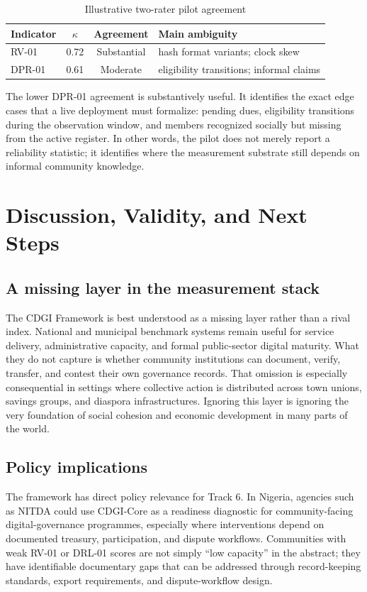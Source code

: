 \documentclass[sigconf,anonymous]{acmart}
\begin{document}
\begin{table}[t]
\caption{Illustrative two-rater pilot agreement}
\label{tab:kappa}
\small
\begin{tabularx}{\columnwidth}{l c c X}
\toprule
Indicator & $\kappa$ & Agreement & Main ambiguity \\
\midrule
RV-01 & 0.72 & Substantial & hash format variants; clock skew \\
DPR-01 & 0.61 & Moderate & eligibility transitions; informal claims \\
\bottomrule
\end{tabularx}
\end{table}

The lower DPR-01 agreement is substantively useful. It identifies the exact edge cases that a live deployment must formalize: pending dues, eligibility transitions during the observation window, and members recognized socially but missing from the active register. In other words, the pilot does not merely report a reliability statistic; it identifies where the measurement substrate still depends on informal community knowledge.

\section{Discussion, Validity, and Next Steps}

\subsection{A missing layer in the measurement stack}

The CDGI Framework is best understood as a missing layer rather than a rival index. National and municipal benchmark systems remain useful for service delivery, administrative capacity, and formal public-sector digital maturity. What they do not capture is whether community institutions can document, verify, transfer, and contest their own governance records. That omission is especially consequential in settings where collective action is distributed across town unions, savings groups, and diaspora infrastructures. Ignoring this layer is ignoring the very foundation of social cohesion and economic development in many parts of the world.

\subsection{Policy implications}

The framework has direct policy relevance for Track 6. In Nigeria, agencies such as NITDA could use CDGI-Core as a readiness diagnostic for community-facing digital-governance programmes, especially where interventions depend on documented treasury, participation, and dispute workflows. Communities with weak RV-01 or DRL-01 scores are not simply ``low capacity'' in the abstract; they have identifiable documentary gaps that can be addressed through record-keeping standards, export requirements, and dispute-workflow design.
\end{document}
